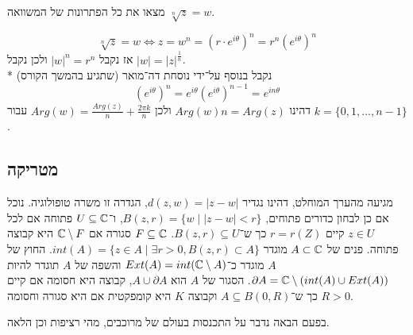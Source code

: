 \begin{exercise}
	מצאו את כל הפתרונות של המשוואה $\sqrt[n]{z} = w$.
\end{exercise}
\begin{solution}
	\[
		\sqrt[n]{z} = w \iff z = w^n = {(r \cdot e^{i\theta})}^n = r^n {(e^{i\theta})}^n
	\]
	אז נקבל ${|w|}^n = r^n$ ולכן נקבל $|w| = {|z|}^\frac{1}{n}$. \\*
	נקבל בנוסף על־ידי נוסחת דה־מואר (שתגיע בהמשך הקורס)
	\[
		{(e^{i\theta})}^n = e^{i\theta} {(e^{i\theta})}^{n - 1} = e^{i n\theta}
	\]
	דהינו $Arg(w) n = Arg(z)$ ולכן $Arg(w) = \frac{Arg(z)}{n} + \frac{2\pi k}{n}$ עבור $k = \{0, 1, \dots, n - 1\}$.
\end{solution}

\subsection{מטריקה}
מגיעה מהערך המוחלט, דהינו נגדיר $d(z, w) = |z - w|$, הגדרה זו משרה טופולוגיה.
נוכל אם כן לבחון כדורים פתוחים, $B(z, r) = \{ w \mid |z - w| < r \}$, ו־$U \subseteq \mathbb{C}$ פתוחה אם לכל $z \in U$ קיים $r = r(Z)$ כך ש־$B(z, r) \subseteq U$.
$F \subseteq \mathbb{C}$ סגורה אם $\mathbb{C} \setminus F$ היא קבוצה פתוחה.
פנים של $A \subset \mathbb{C}$ מוגדר $int(A) = \{ z \in A \mid \exists r > 0, B(z, r) \subset A \}$.
החוץ של $A$ מוגדר כ־$Ext(A) = int(\mathbb{C} \setminus A)$ והשפה של $A$ תוגדר להיות $\partial A = \mathbb{C} \setminus (int(A) \cup Ext(A))$.
הסגור של $A$ הוא $A \cup \partial A$, קבוצה היא חסומה אם קיים $R > 0$ כך ש־$A \subseteq B(0, R)$ וקבוצה $K$ היא קומפקטית אם היא סגורה וחסומה.

בפעם הבאה נדבר על התכנסות בעולם של מרוכבים, מהי רציפות וכן הלאה.

